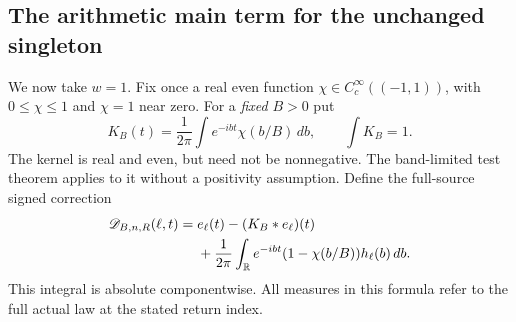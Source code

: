 \subsection{The arithmetic main term for the unchanged singleton}
We now take $w=1$. Fix once a real even function
$\chi\in C_c^\infty((-1,1))$, with $0\le\chi\le1$ and
$\chi=1$ near zero. For a \emph{fixed} $B>0$ put
\[
 K_B(t)=\frac1{2\pi}\int e^{-ibt}\chi(b/B)\,db,
 \qquad \int K_B=1.
\]
The kernel is real and even, but need not be nonnegative. The
band-limited test theorem applies to it without a positivity
assumption. Define the full-source signed correction
\begin{align}\label{eq:v43-fixed-band-correction}
 \mathscr D_{B,n,R}(\ell,t)
  ={}&e_\ell(t)-(K_B*e_\ell)(t)\notag\\
     &+\frac1{2\pi}\int_\R e^{-ibt}
                         (1-\chi(b/B))h_\ell(b)\,db.
\end{align}
This integral is absolute componentwise. All measures in this formula
refer to the full actual law at the stated return index.

